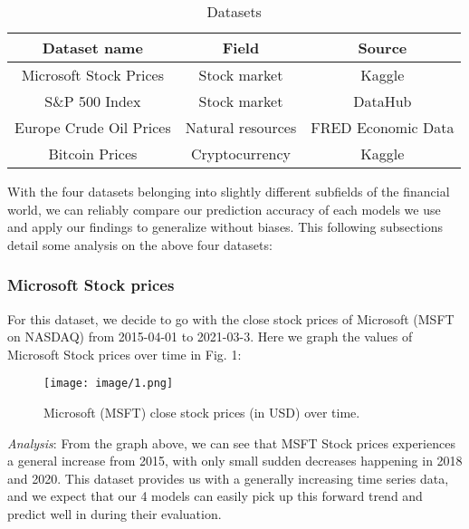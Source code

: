 \documentclass[letterpaper, 10 pt, conference]{ieeeconf}  %
\begin{document}
        \begin{table}[h!] \centering
            \caption{Datasets }
            \begin{threeparttable}
                    \begin{tabular}{|c||c|c|}
                        \hline
                        Dataset name & Field & Source\\
                        \hline
                        Microsoft Stock Prices & Stock market & Kaggle\tablefootnote{\url{https://www.kaggle.com/vijayvvenkitesh/microsoft-stock-time-series-analysis}}\\
                        S\&P 500 Index & Stock market & DataHub\tablefootnote{\url{https://datahub.io/core/s-and-p-500}}\\
                        Europe Crude Oil Prices & Natural resources & FRED Economic Data\tablefootnote{\url{https://fred.stlouisfed.org/series/DCOILBRENTEU}}\\
                        Bitcoin Prices & Cryptocurrency & Kaggle\tablefootnote{\url{https://www.kaggle.com/sudalairajkumar/cryptocurrencypricehistory}}\\
                        \hline
                    \end{tabular}
            \end{threeparttable}
        \end{table}

        With the four datasets belonging into slightly different subfields of the financial world, we can reliably compare our prediction accuracy of each models we use and apply our findings to generalize without biases. This following subsections detail some analysis on the above four datasets:

        \subsubsection{Microsoft Stock prices} For this dataset, we decide to go with the close stock prices of Microsoft (MSFT on NASDAQ) from 2015-04-01 to 2021-03-3. Here we graph the values of Microsoft Stock prices over time in Fig. 1:
        \begin{figure}[thpb]
            \centering
            \texttt{[image: image/1.png]}
            \caption{Microsoft (MSFT) close stock prices (in USD) over time.}
            \label{figurelabel}
        \end{figure}
        
        \textit{Analysis}: From the graph above, we can see that MSFT Stock prices experiences a general increase from 2015, with only small sudden decreases happening in 2018 and 2020. This dataset provides us with a generally increasing time series data, and we expect that our 4 models can easily pick up this forward trend and predict well in during their evaluation. 
\end{document}
